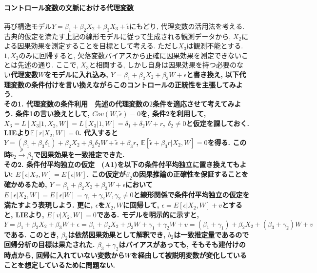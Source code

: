 \documentclass[paper=a4paper,fontsize=10pt]{jlreq}
\begin{document}
\paragraph{コントロール変数の文脈における代理変数}
再び構造モデル$Y=\beta_1+\beta_2X_{2}+\beta_3X_{3}+\tilde{\epsilon}$にもどり, 代理変数の活用法を考える. 古典的仮定を満たす上記の線形モデルに従って生成される観測データから, $X_2$による因果効果を測定することを目標として考える. ただし$X_{3}$は観測不能とする. $1, X_{2}$のみに回帰すると, 欠落変数バイアスから正確に因果効果を測定できないことは先述の通り. ここで, $X_{3}$と相関する, しかし自身は因果効果を持つ必要のない\rmfamily\mcfamily\bfseries{代理変数}\mdseries $W$をモデルに入れ込み, $Y=\beta_1+\beta_2X_{2}+\beta_3W+\epsilon$と書き換え, 以下代理変数の条件付けを言い換えながらこのコントロールの正統性を主張してみよう.\\

\rmfamily\mcfamily\bfseries{その1. 代理変数の条件利用}\mdseries　先述の代理変数の$2$条件を適応させて考えてみよう. 条件1の言い換えとして, $Cov(W, \tilde{\epsilon})=0$を, 条件2を利用して, $X_3=L[X_3|1, X_2, W]=L[X_3|1, W]=\delta_1 + \delta_2W+r$, $\delta_2\neq0$と仮定を課しておく. LIEより$\mathbb{E}[r|X_2, W]=0$. 代入すると$Y=(\beta_1+\beta_3\delta_1)+\beta_2X_{2}+\beta_3\delta_2W+\tilde{\epsilon}+\beta_3r$, $\mathbb{E}[\tilde{\epsilon}+\beta_3r|X_2, W]=0$を得る. この時$b_2 \overset{p}{\to}\beta_2$で因果効果を一致推定できた.\\

\rmfamily\mcfamily\bfseries{その2. 条件付平均独立の仮定}\mdseries　(A1)を以下の\rmfamily\mcfamily\bfseries{条件付平均独立}\mdseries に置き換えてもよい: $E[\epsilon | X_{2}, W]=E[\epsilon| W]$. この仮定が$\beta_2$の因果推論の正確性を保証することを確かめるため, $Y=\beta_1+\beta_2X_{2}+\beta_3W+\epsilon$において$E[\epsilon | X_{2}, W]=E[\epsilon|W]=\gamma_1+\gamma_2W, \gamma_2\neq0$と線形関係で条件付平均独立の仮定を満たすよう表現しよう. 更に, $\epsilon$を$X_{2}, W$に回帰して, $\epsilon=E[\epsilon|X_{2}, W]+v$とすると, LIEより, $E[v|X_{2}, W]=0$である. モデルを明示的に示すと, $Y=\beta_1+\beta_2X_{2}+\beta_3W+\epsilon=\beta_1+\beta_2X_{2}+\beta_3W+\gamma_1+\gamma_2W+v=(\beta_1+\gamma_1)+\beta_2X_{2}+(\beta_3+\gamma_2)W+v$である. このとき, $\beta_2$は依然因果効果として解釈でき, $b_2$は一致推定量であるので回帰分析の目標は果たされた. $\beta_3+\gamma_2$はバイアスがあっても, そもそも建付けの時点から, 回帰に入れていない変数から$W$を経由して被説明変数が変化していることを想定しているために問題ない.\\
\end{document}
